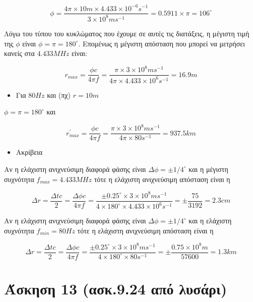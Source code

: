 \documentclass[a4paper,11pt,titlepage]{article}
\newcommand{\degrees}{^{\circ}}
\numberwithin{equation}{section} %
\begin{document}
\begin{equation}
 \phi=\frac{4\pi \times10m \times 4.433\times10^{-6}s^{-1}}{3\times10^8ms^{-1}}=0.5911\times\pi=106\degrees
\end{equation}

Λόγω του τύπου του κυκλώματος που έχουμε σε αυτές τις διατάξεις, η μέγιστη τιμή της $\phi$ είναι $\phi=\pi=180\degrees$. Επομένως η μέγιστη απόσταση που μπορεί να μετρήσει κανείς στα $4.433MHz$ είναι:

\begin{equation}
 r_{max}=\frac{\phi c}{4\pi f}=\frac{\pi\times 3\times10^8ms^{-1}}{4\pi\times 4.433\times10^{6} s^{-1}}=16.9m
\end{equation}

\begin{itemize}
 \item Για $80Hz$ και (πχ) $r=10m$
\end{itemize}

$\phi=\pi=180\degrees$ και 

\begin{equation}
 r^{'}_{max}=\frac{\phi c}{4\pi f}=\frac{\pi\times 3\times10^8ms^{-1}}{4\pi\times 80s^{-1}}=937.5 km
\end{equation}

\begin{itemize}
 \item Ακρίβεια
\end{itemize}

Αν η ελάχιστη ανιχνεύσιμη διαφορά φάσης είναι $\Delta\phi=\pm1/4\degrees$ και η μέγιστη συχνότητα $f_{max}=4.433MHz$ τότε η ελάχιστη ανιχνεύσιμη απόσταση είναι η 

\begin{equation}
 \Delta r=\frac{\Delta tc}{2}=\frac{\Delta\phi c}{4\pi f}=\frac{\pm 0.25\degrees\times 3\times10^8ms^{-1}}{4\times 180\degrees \times 4.433\times10^6s^{-1}}=\pm\frac{75}{3192}=2.3cm
\end{equation}

Αν η ελάχιστη ανιχνεύσιμη διαφορά φάσης είναι $\Delta\phi=\pm1/4\degrees$ και η ελάχιστη συχνότητα $f_{min}=80Hz$ τότε η ελάχιστη ανιχνεύσιμη απόσταση είναι η 

\begin{equation}
 \Delta r=\frac{\Delta tc}{2}=\frac{\Delta\phi c}{4\pi f}=\frac{\pm 0.25\degrees\times 3\times10^8ms^{-1}}{4\times 180\degrees \times 80s^{-1}}=\pm\frac{0.75\times10^8m}{57600}=1.3km
\end{equation}

\section{Άσκηση 13 (ασκ.9.24 από λυσάρι)}
\end{document}
